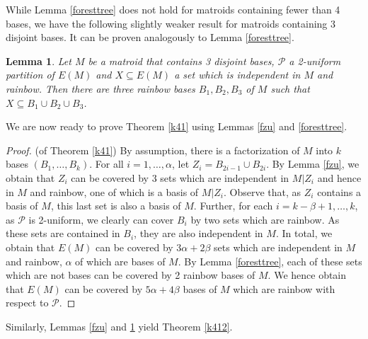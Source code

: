 \documentclass{article}
\newtheorem{Corollary}[Statement]{Corollary}
\newtheorem{Lemma}[Statement]{Lemma}
\begin{document}
While Lemma \ref{foresttree} does not hold for matroids containing fewer than 4 bases, we have the following slightly weaker result for matroids containing 3 disjoint bases. It can be proven analogously to Lemma \ref{foresttree}.
\begin{Lemma}\label{foresttree2}
Let $M$ be a matroid that contains 3 disjoint bases, $\mathcal{P}$ a 2-uniform partition of $E(M)$ and $X \subseteq E(M)$ a set which is independent in $M$ and rainbow. Then there are three rainbow bases $B_1,B_2,B_3$ of $M$ such that $X\subseteq B_1 \cup B_2\cup B_3$.
\end{Lemma}

We are now ready to prove Theorem \ref{k41} using Lemmas \ref{fzu} and \ref{foresttree}.

\begin{proof}(of Theorem \ref{k41})
By assumption, there is a factorization of $M$ into $k$ bases $(B_1,\ldots,B_k)$. For all $i=1,\ldots,\alpha$, let $Z_i=B_{2i-1}\cup B_{2i}$. By Lemma \ref{fzu}, we obtain that $Z_i$ can be covered by 3 sets which are independent in $M|Z_i$ and hence in $M$ and rainbow, one of which is a basis of $M|Z_i$. Observe that, as $Z_i$ contains a basis of $M$,  this last set is also a basis of $M$. Further, for each $i = k-\beta+1,\ldots,k$, as $\mathcal{P}$ is 2-uniform, we clearly can cover $B_i$ by two sets which are rainbow. As these sets are contained in $B_i$, they are also independent in $M$. In total, we obtain that $E(M)$ can be covered by $3 \alpha+2\beta$ sets which are independent in $M$ and rainbow,  $\alpha$ of which are bases of $M$. By Lemma \ref{foresttree}, each of these sets which are not bases can be covered by 2 rainbow bases of $M$. We hence obtain that $E(M)$ can be covered by $5 \alpha+4 \beta$ bases of $M$ which are rainbow with respect to $\mathcal{P}$.
\end{proof}
Similarly, Lemmas \ref{fzu} and \ref{foresttree2} yield Theorem \ref{k412}.
\end{document}
